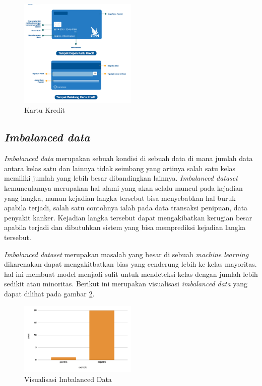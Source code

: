 \begin{figure}[H] %
    \centering
    \includegraphics[width=0.5\textwidth]{figure/kartu.png}
    \caption{Kartu Kredit}
    \label{fig:2.kartukredit}
\end{figure}

\subsection{\textit{Imbalanced data}} \label{II.Imbalanced Data}
\textit{Imbalanced data} merupakan sebuah kondisi di sebuah data di mana jumlah data antara kelas satu dan lainnya tidak seimbang yang artinya salah satu kelas memiliki jumlah yang lebih besar dibandingkan lainnya\cite{haixiang2017learning}. \textit{Imbalanced dataset} kemunculannya merupakan hal alami yang akan selalu muncul pada kejadian yang langka, namun kejadian langka tersebut bisa menyebabkan hal buruk apabila terjadi, salah satu contohnya ialah  pada data transaksi penipuan, data penyakit kanker\cite{krawczyk2016learning}. Kejadian langka tersebut dapat mengakibatkan kerugian besar apabila terjadi dan dibutuhkan sistem yang bisa memprediksi kejadian langka tersebut\cite{krawczyk2016learning}.

\textit{Imbalanced dataset} merupakan masalah yang besar di sebuah\textit{ machine learning} dikarenakan dapat mengakitbatkan bias yang cenderung lebih ke kelas mayoritas. hal ini membuat model menjadi sulit untuk mendeteksi kelas dengan jumlah lebih sedikit atau minoritas\cite{haixiang2017learning}. Berikut ini merupakan visualisasi \textit{imbalanced data} yang dapat dilihat pada gambar \ref{fig:2.visualisasiimbalanced}.
\begin{figure}[H] %
    \centering
    \includegraphics[width=0.5\textwidth]{figure/gambar imbalance data.png}
    \caption{Visualisasi Imbalanced Data}
    \label{fig:2.visualisasiimbalanced}
\end{figure}


